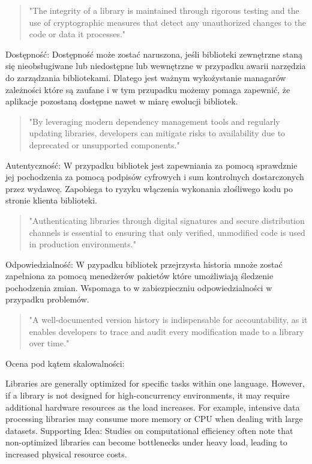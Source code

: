\documentclass[runningheads,12pt]{llncs}
\begin{document}
\begin{quote}
    "The integrity of a library is maintained through rigorous testing and the use of cryptographic measures that detect any unauthorized changes to the code or data it processes." ~\cite[p. 84]{Essential}
\end{quote}

Dostępność: Dostępność może zostać naruszona, jeśli biblioteki zewnętrzne staną się nieobsługiwane lub niedostępne lub wewnętrzne w przypadku awarii narzędzia do zarządzania bibliotekami. Dlatego jest ważnym wykożystanie managarów zależności które są zaufane i w tym przupadku możemy pomaga zapewnić, że aplikacje pozostaną dostępne nawet w miarę ewolucji bibliotek.

\begin{quote}
    "By leveraging modern dependency management tools and regularly updating libraries, developers can mitigate risks to availability due to deprecated or unsupported components." ~\cite[p. 85]{Essential}
\end{quote}

Autentyczność: W przypadku bibliotek jest zapewniania za pomocą sprawdznie jej pochodzenia za pomocą podpisów cyfrowych i sum kontrolnych dostarczonych przez wydawcę. Zapobiega to ryzyku włączenia wykonania złośliwego kodu po stronie klienta biblioteki. 

\begin{quote}
    "Authenticating libraries through digital signatures and secure distribution channels is essential to ensuring that only verified, unmodified code is used in production environments." ~\cite[p. 87]{Essential}
\end{quote}

Odpowiedzialność: W pzypadku bibliotek przejrzysta historia mnoże zostać zapełniona za pomocą menedżerów pakietów które umożliwiają śledzenie pochodzenia zmian. Wspomaga to w zabiezpieczniu odpowiedzialności w przypadku problemów.

\begin{quote}
    "A well-documented version history is indispensable for accountability, as it enables developers to trace and audit every modification made to a library over time." ~\cite[p. 88]{Essential}
\end{quote}

Ocena pod kątem skalowalności:

Libraries are generally optimized for specific tasks within one language. However, if a library is not designed for high-concurrency environments, it may require additional hardware resources as the load increases. For example, intensive data processing libraries may consume more memory or CPU when dealing with large datasets. Supporting Idea: Studies on computational efficiency often note that non-optimized libraries can become bottlenecks under heavy load, leading to increased physical resource costs.
\end{document}
